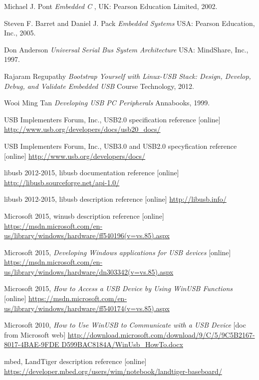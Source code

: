 \documentclass{BscUS}
\begin{document}
\begin{thebibliography}{1}

 Michael J. Pont {\em Embedded C       },  UK: Pearson Education Limited, 2002.

 Steven F. Barret and Daniel J. Pack {\em Embedded Systems} USA: Pearson Education, Inc., 2005.

 Don Anderson {\em Universal Serial Bus System Architecture } USA: MindShare, Inc., 1997.

 Rajaram Regupathy {\em Bootstrap Yourself with Linux-USB Stack: Design, Develop, Debug, and Validate Embedded USB } Course Technology, 2012.

 Wooi Ming Tan {\em Developing USB PC Peripherals } Annabooks, 1999.

 USB Implementers Forum, Inc., USB2.0 specification reference [online] 
\newline 
\url{http://www.usb.org/developers/docs/usb20_docs/}

 USB Implementers Forum, Inc., USB3.0 and USB2.0 specyfication reference [online] 
\newline 
\url{http://www.usb.org/developers/docs/}

 libusb 2012-2015, libusb documentation reference [online]
\newline 
\url{http://libusb.sourceforge.net/api-1.0/}

 libusb 2012-2015, libusb description reference [online]
\newline 
\url{http://libusb.info/}


 Microsoft 2015, winusb description reference [online]
\newline 
\url{https://msdn.microsoft.com/en-us/library/windows/hardware/ff540196(v=vs.85).aspx}

 Microsoft 2015, {\em Developing Windows applications for USB devices} [online]
\newline 
\url{https://msdn.microsoft.com/en-us/library/windows/hardware/dn303342(v=vs.85).aspx}

 Microsoft 2015, {\em How to Access a USB Device by Using WinUSB Functions} [online]
\newline 
\url{https://msdn.microsoft.com/en-us/library/windows/hardware/ff540174(v=vs.85).aspx}

 Microsoft 2010, {\em How to Use WinUSB to Communicate with a USB Device} [doc from Microsoft web]
\newline 
\url{http://download.microsoft.com/download/9/C/5/9C5B2167-8017-4BAE-9FDE D599BAC8184A/WinUsb_HowTo.docx}

 mbed, LandTiger description reference [online]
\newline 
\url{https://developer.mbed.org/users/wim/notebook/landtiger-baseboard/}


\end{thebibliography}
\end{document}
